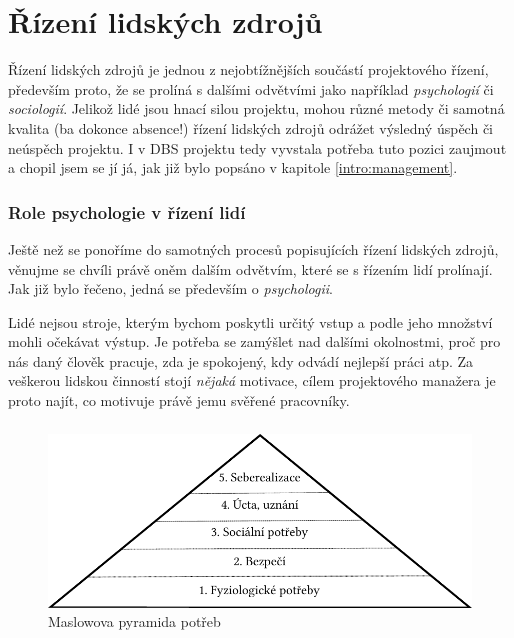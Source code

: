 \chapter{Řízení lidských zdrojů} \label{DBSmanagement}

Řízení lidských zdrojů je jednou z nejobtížnějších součástí projektového řízení, především proto, že se prolíná s dalšími odvětvími jako například \emph{psychologií} či \emph{sociologií}. Jelikož lidé jsou hnací silou projektu, mohou různé metody či samotná kvalita (ba dokonce absence!) řízení lidských zdrojů odrážet výsledný úspěch či neúspěch projektu. I v DBS projektu tedy vyvstala potřeba tuto pozici zaujmout a chopil jsem se jí já, jak již bylo popsáno v kapitole \ref{intro:management}.

\subsection{Role psychologie v řízení lidí}
Ještě než se ponoříme do samotných procesů popisujících řízení lidských zdrojů, věnujme se chvíli právě oněm dalším odvětvím, které se s řízením lidí prolínají. Jak již bylo řečeno, jedná se především o \emph{psychologii}.

Lidé nejsou stroje, kterým bychom poskytli určitý vstup a podle jeho množství mohli očekávat výstup. Je potřeba se zamýšlet nad dalšími okolnostmi, proč pro nás daný člověk pracuje, zda je spokojený, kdy odvádí nejlepší práci atp. Za veškerou lidskou činností stojí \emph{nějaká} motivace, cílem projektového manažera je proto najít, co motivuje právě jemu svěřené pracovníky.

\paragraph{}
\begin{figure}[h]
\includegraphics[width=\textwidth]{../pdf/maslow.pdf}
\caption{Maslowova pyramida potřeb} \label{picture:maslow}
\end{figure}

